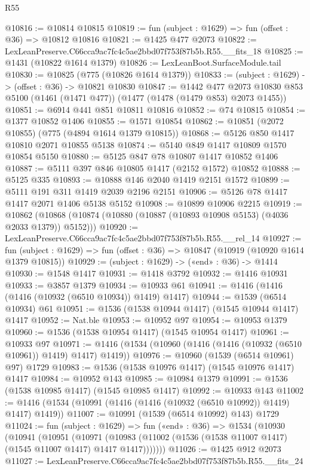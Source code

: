 \begin{lexlean}{R55}
\begin{coremodule}
{{@10816 := @10814 @10815
@10819 := fun (subject : @1629) => fun (offset : @36) => @10812 @10816
@10821 := @1425 @477 @2073
@10822 := LexLeanPreserve.C66cca9ac7fc4c5ae2bbd07f753f87b5b.R55.__fits_18
@10825 := @1431 (@10822 @1614 @1379)
@10826 := LexLeanBoot.SurfaceModule.tail
@10830 := @10825 (@775 (@10826 @1614 @1379))
@10833 := (subject : @1629) -> (offset : @36) -> @10821 @10830
@10847 := @1442
    @477
    @2073
    @10830
    @853
    @5100
    (@1461 (@1471 @477))
    (@1477 (@1478 (@1479 @853) @2073 @1455))
@10851 := @6914 @441 @851 @10811 @10816
@10852 := @74 @10815
@10854 := @1377 @10852 @1406
@10855 := @1571 @10854
@10862 := @10851 (@2072 @10855) (@775 (@4894 @1614 @1379 @10815))
@10868 := @5126 @850 @1417 @10810 @2071 @10855 @5138
@10874 := @5140 @849 @1417 @10809 @1570 @10854 @5150
@10880 := @5125 @847 @78 @10807 @1417 @10852 @1406
@10887 := @5111 @397 @846 @10805 @1417 (@2152 @1572) @10852
@10888 := @5125 @335
@10893 := @10888 @146 @2040 @1419 @2151 @1572
@10899 := @5111 @191 @311 @1419 @2039 @2196 @2151
@10906 := @5126 @78 @1417 @1417 @2071 @1406 @5138 @5152
@10908 := @10899 @10906 @2215
@10919 := @10862 (@10868 (@10874 (@10880 (@10887 (@10893 @10908 @5153) (@4036 @2033 @1379)) @5152)))
@10920 := LexLeanPreserve.C66cca9ac7fc4c5ae2bbd07f753f87b5b.R55.__rel_14
@10927 := fun (subject : @1629) => fun (offset : @36) => @10847 (@10919 (@10920 @1614 @1379 @10815))
@10929 := (subject : @1629) -> («end» : @36) -> @1414
@10930 := @1548 @1417
@10931 := @1418 @3792
@10932 := @1416 @10931
@10933 := @3857 @1379
@10934 := @10933 @61
@10941 := @1416 (@1416 (@1416 (@10932 (@6510 @10934)) @1419) @1417)
@10944 := @1539 (@6514 @10934) @61
@10951 := @1536 (@1538 @10944 @1417) (@1545 @10944 @1417) @1417
@10952 := Nat.ble
@10953 := @10952 @97
@10954 := @10953 @1379
@10960 := @1536 (@1538 @10954 @1417) (@1545 @10954 @1417)
@10961 := @10933 @97
@10971 := @1416 (@1534 (@10960 (@1416 (@1416 (@10932 (@6510 @10961)) @1419) @1417) @1419))
@10976 := @10960 (@1539 (@6514 @10961) @97) @1729
@10983 := @1536 (@1538 @10976 @1417) (@1545 @10976 @1417) @1417
@10984 := @10952 @143
@10985 := @10984 @1379
@10991 := @1536 (@1538 @10985 @1417) (@1545 @10985 @1417)
@10992 := @10933 @143
@11002 := @1416 (@1534 (@10991 (@1416 (@1416 (@10932 (@6510 @10992)) @1419) @1417) @1419))
@11007 := @10991 (@1539 (@6514 @10992) @143) @1729
@11024 := fun (subject : @1629) =>
  fun («end» : @36) =>
  @1534
    (@10930
      (@10941
        (@10951
          (@10971
            (@10983 (@11002 (@1536 (@1538 @11007 @1417) (@1545 @11007 @1417) @1417 @1417)))))))
@11026 := @1425 @912 @2073
@11027 := LexLeanPreserve.C66cca9ac7fc4c5ae2bbd07f753f87b5b.R55.__fits_24
}}
\end{coremodule}
\end{lexlean}
